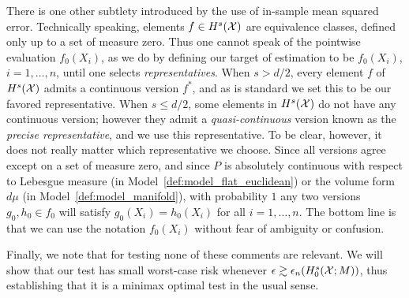 There is one other subtlety introduced by the use of in-sample mean squared error. Technically speaking, elements $f \in H^s(\mathcal{X})$ are equivalence classes, defined only up to a set of measure zero. Thus one cannot speak of the pointwise evaluation $f_0(X_i)$, as we do by defining our target of estimation to be $f_0(X_i)$, $i=1,\ldots,n$, until one selects \emph{representatives}. When $s > d/2$, every element $f$ of $H^s(\mathcal{X})$ admits a continuous version $f^{\ast}$, and as is standard we set this to be our favored representative. When $s \leq d/2$, some elements in $H^s(\mathcal{X})$ do not have any continuous version; however they admit a \emph{quasi-continuous} version \citep{evans15} known as the \emph{precise representative}, and we use this representative. To be clear, however, it does not really matter which representative we choose. Since all versions agree except on a set of measure zero, and since $P$ is absolutely continuous with respect to Lebesgue measure (in Model~\ref{def:model_flat_euclidean}) or the volume form $d\mu$ (in Model~\ref{def:model_manifold}), with probability $1$ any two versions $g_0, h_0 \in f_0$ will satisfy $g_0(X_i) = h_0(X_i)$ for all $i = 1,\ldots,n$. The bottom line is that we can use the notation $f_0(X_i)$ without fear of ambiguity or confusion.

Finally, we note that for testing none of these comments are relevant. We will show that our test has small worst-case risk whenever $\epsilon \gtrsim \epsilon_n(H_0^s(\mathcal{X};M))$, thus establishing that it is a minimax optimal test in the usual sense.

